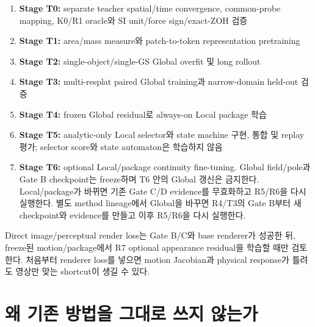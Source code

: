\documentclass[11pt]{article}
\begin{document}
\begin{enumerate}
  \item \textbf{Stage T0:} separate teacher spatial/time convergence, common-probe mapping,
  K0/R1 oracle와 SI unit/force sign/exact-ZOH 검증
  \item \textbf{Stage T1:} area/mass measure와 patch-to-token representation pretraining
  \item \textbf{Stage T2:} single-object/single-GS Global overfit 및 long rollout
  \item \textbf{Stage T3:} multi-resplat paired Global training과 narrow-domain held-out 검증
  \item \textbf{Stage T4:} frozen Global residual로 always-on Local package 학습
  \item \textbf{Stage T5:} analytic-only Local selector와 state machine 구현, 통합 및 replay 평가;
  selector score와 state automaton은 학습하지 않음
  \item \textbf{Stage T6:} optional Local/package continuity fine-tuning. Global field/pole과
  Gate B checkpoint는 freeze하며 T6 안의 Global 갱신은 금지한다. Local/package가 바뀌면 기존
  Gate C/D evidence를 무효화하고 R5/R6을 다시 실행한다. 별도 method lineage에서 Global을 바꾸면
  R4/T3의 Gate B부터 새 checkpoint와 evidence를 만들고 이후 R5/R6을 다시 실행한다.
\end{enumerate}

Direct image/perceptual render loss는 Gate B/C와 base renderer가 성공한 뒤,
freeze된 motion/package에서 R7 optional appearance residual을 학습할 때만 검토한다.
처음부터 renderer loss를 넣으면 motion Jacobian과 physical response가 틀려도 영상만 맞는 shortcut이 생길 수 있다.

\section{왜 기존 방법을 그대로 쓰지 않는가}
\end{document}
